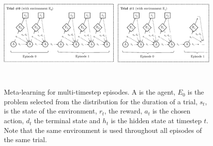 \begin{figure}
	\centering
	\includegraphics[width=\linewidth]{fig/meta_cartpole.eps}
	\caption{Meta-learning for multi-timestep episodes. A is the agent,
	$E_0$ is the problem selected from the distribution for the duration
	of a trial, $s_t$, is the state of the environment, $r_t$, the reward,
	$a_t$ is the chosen action, $d_t$ the terminal state and $h_t$ is
	the hidden state at timestep $t$. Note that the same environment is
	used throughout all episodes of the same trial.} 
	\label{fig:meta_cartpole}
\end{figure}



